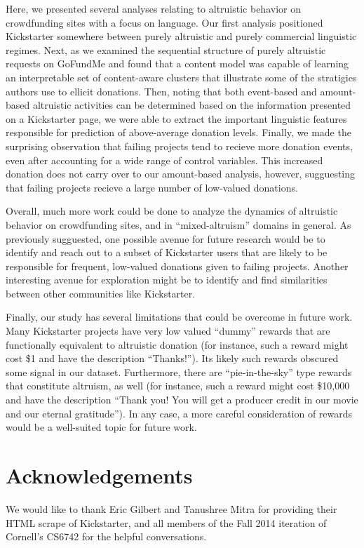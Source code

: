\documentclass[letterpaper]{article}
\begin{document}
Here, we presented several analyses relating to altruistic behavior on crowdfunding sites with a focus on language. Our first analysis positioned Kickstarter somewhere between purely altruistic and purely commercial linguistic regimes. Next, as we examined the sequential structure of purely altruistic requests on GoFundMe and found that a content model was capable of learning an interpretable set of content-aware clusters that illustrate some of the stratigies authors use to ellicit donations. Then, noting that both event-based and amount-based altruistic activities can be determined based on the information presented on a Kickstarter page, we were able to extract the important linguistic features responsible for prediction of above-average donation levels. Finally, we made the surprising observation that failing projects tend to recieve more donation events, even after accounting for a wide range of control variables. This increased donation does not carry over to our amount-based analysis, however, sugguesting that failing projects recieve a large number of low-valued donations.

Overall, much more work could be done to analyze the dynamics of altruistic behavior on crowdfunding sites, and in ``mixed-altruism'' domains in general. As previously sugguested, one possible avenue for future research would be to identify and reach out to a subset of Kickstarter users that are likely to be responsible for frequent, low-valued donations given to failing projects. Another interesting avenue for exploration might be to identify and find similarities between other communities like Kickstarter.

Finally, our study has several limitations that could be overcome in future work. Many Kickstarter projects have very low valued ``dummy'' rewards that are functionally equivalent to altruistic donation (for instance, such a reward might cost \$1 and have the description ``Thanks!''). Its likely such rewards obscured some signal in our dataset. Furthermore, there are ``pie-in-the-sky'' type rewards that constitute altruism, as well (for instance, such a reward might cost \$10,000 and have the description ``Thank you! You will get a producer credit in our movie and our eternal gratitude''). In any case, a more careful consideration of rewards would be a well-suited topic for future work.

\section{Acknowledgements}

We would like to thank Eric Gilbert and Tanushree Mitra for providing their HTML scrape of Kickstarter, and all members of the Fall 2014 iteration of Cornell's CS6742 for the helpful conversations.

 
\end{document}
